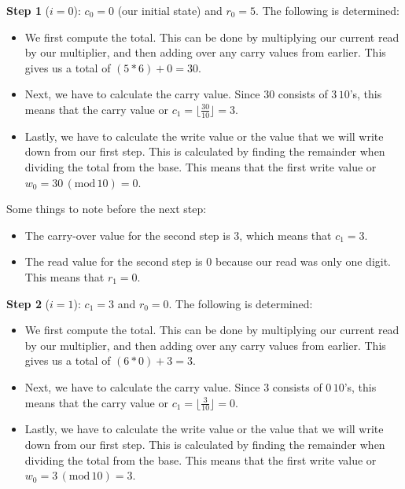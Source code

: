 \documentclass{article}
\begin{document}
\noindent 
\textbf{Step 1} ($i=0$): $c_0 = 0$ (our initial state) and $r_0 = 5$. The following is determined: 
\begin{itemize}
  \item We first compute the total. This can be done by multiplying our current read by our multiplier, and then adding over any carry values from earlier. This gives us a total of $(5*6) + 0 = 30$.
  \item Next, we have to calculate the carry value. Since $30$ consists of $3 \, 10$'s, this means that the carry value or $c_1 = \lfloor{\frac{30}{10}}\rfloor = 3$. 
  \item Lastly, we have to calculate the write value or the value that we will write down from our first step. This is calculated by finding the remainder when dividing the total from the base. This means that the first write value or $w_0 = 30 \, (\text{mod} \, 10) = 0$.
\end{itemize} \vspace{\baselineskip}

\noindent
Some things to note before the next step:
\begin{itemize}
    \item The carry-over value for the second step is 3, which means that $c_1 = 3$.
    \item The read value for the second step is 0 because our read was only one digit. This means that $r_1 = 0$.
\end{itemize}

\noindent 
\textbf{Step 2} ($i=1$): $c_1 = 3$ and $r_0 = 0$. The following is determined: 
\begin{itemize}
  \item We first compute the total. This can be done by multiplying our current read by our multiplier, and then adding over any carry values from earlier. This gives us a total of $(6*0) + 3 = 3$.
  \item Next, we have to calculate the carry value. Since $3$ consists of $0 \, 10$'s, this means that the carry value or $c_1 = \lfloor{\frac{3}{10}}\rfloor = 0$. 
  \item Lastly, we have to calculate the write value or the value that we will write down from our first step. This is calculated by finding the remainder when dividing the total from the base. This means that the first write value or $w_0 = 3 \, (\text{mod} \, 10) = 3$.
\end{itemize} \vspace{\baselineskip}
\end{document}
